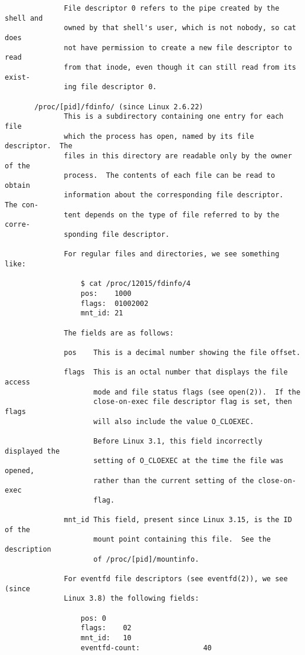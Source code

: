 \documentclass[]{article}
\begin{document}
\begin{verbatim}
              File descriptor 0 refers to the pipe created by the shell and
              owned by that shell's user, which is not nobody, so cat does
              not have permission to create a new file descriptor to read
              from that inode, even though it can still read from its exist‐
              ing file descriptor 0.

       /proc/[pid]/fdinfo/ (since Linux 2.6.22)
              This is a subdirectory containing one entry for each file
              which the process has open, named by its file descriptor.  The
              files in this directory are readable only by the owner of the
              process.  The contents of each file can be read to obtain
              information about the corresponding file descriptor.  The con‐
              tent depends on the type of file referred to by the corre‐
              sponding file descriptor.

              For regular files and directories, we see something like:

                  $ cat /proc/12015/fdinfo/4
                  pos:    1000
                  flags:  01002002
                  mnt_id: 21

              The fields are as follows:

              pos    This is a decimal number showing the file offset.

              flags  This is an octal number that displays the file access
                     mode and file status flags (see open(2)).  If the
                     close-on-exec file descriptor flag is set, then flags
                     will also include the value O_CLOEXEC.

                     Before Linux 3.1, this field incorrectly displayed the
                     setting of O_CLOEXEC at the time the file was opened,
                     rather than the current setting of the close-on-exec
                     flag.

              mnt_id This field, present since Linux 3.15, is the ID of the
                     mount point containing this file.  See the description
                     of /proc/[pid]/mountinfo.

              For eventfd file descriptors (see eventfd(2)), we see (since
              Linux 3.8) the following fields:

                  pos: 0
                  flags:    02
                  mnt_id:   10
                  eventfd-count:               40


\end{verbatim}
\end{document}
